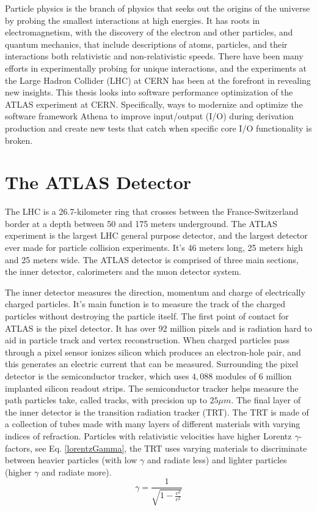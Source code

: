 Particle physics is the branch of physics that seeks out the origins of the universe by probing the smallest interactions at high energies.
It has roots in electromagnetism, with the discovery of the electron and other particles, and quantum mechanics, that include descriptions of atoms, particles, and their interactions both relativistic and non-relativistic speeds. 
There have been many efforts in experimentally probing for unique interactions, and the experiments at the Large Hadron Collider (LHC) at CERN has been at the forefront in revealing new insights.  
This thesis looks into software performance optimization of the ATLAS experiment at CERN. 
Specifically, ways to modernize and optimize the software framework Athena to improve input/output (I/O) during derivation production and create new tests that catch when specific core I/O functionality is broken.

\section{The ATLAS Detector}

The LHC is a 26.7-kilometer ring that crosses between the France-Switzerland border at a depth between 50 and 175 meters underground.\cite{LHC_faq_guide}
The ATLAS experiment is the largest LHC general purpose detector, and the largest detector ever made for particle collision experiments. 
It's 46 meters long, 25 meters high and 25 meters wide.\cite{ATLAS_Fact_Sheet}
The ATLAS detector is comprised of three main sections, the inner detector, calorimeters and the muon detector system. 

The inner detector measures the direction, momentum and charge of electrically charged particles.
It's main function is to measure the track of the charged particles without destroying the particle itself.
The first point of contact for ATLAS is the pixel detector. 
It has over 92 million pixels and is radiation hard to aid in particle track and vertex reconstruction.\cite{Hugging2006}
When charged particles pass through a pixel sensor ionizes silicon which produces an electron-hole pair, and this generates an electric current that can be measured. \cite{Giangiacomi:2684079}
Surrounding the pixel detector is the semiconductor tracker, which uses $4,088$ modules of 6 million implanted silicon readout strips.
The semiconductor tracker helps measure the path particles take, called tracks, with precision up to $25\mu m$. 
The final layer of the inner detector is the transition radiation tracker (TRT). 
The TRT is made of a collection of tubes made with many layers of different materials with varying indices of refraction.  
Particles with relativistic velocities have higher Lorentz $\gamma$-factors, see Eq. \eqref{lorentzGamma}, the TRT uses varying materials to discriminate between heavier particles (with low $\gamma$ and radiate less) and lighter particles (higher $\gamma$ and radiate more). \cite{Mindur:2139567}
\begin{equation}\label{lorentzGamma}
    \gamma = \frac{1}{\sqrt{1 - \frac{v^2}{c^2}}}
\end{equation}

